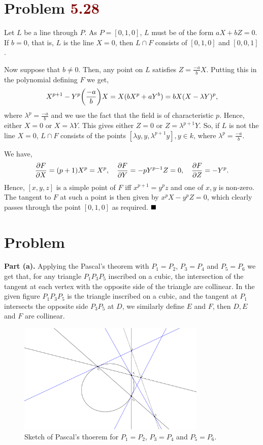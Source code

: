 \documentclass[12pt]{article}
\begin{document}
\section*{Problem \textcolor{maroon}{5.28}}

Let \( L \) be a line through \( P \). As \( P = [0,1,0] \), \( L \) must be of the form \( aX+bZ=0 \). If \( b = 0 \), that is, \( L \) is the line \( X = 0 \), then \( L \cap F \) consists of \( [0,1,0] \) and \( [0,0,1] \).
\smallskip

Now suppose that \( b \neq 0 \). Then, any point on \( L \) satisfies \( Z = \frac{-a}{b}X \). Putting this in the polynomial defining \( F \) we get,
\[
   X^{p+1}-Y^p \qty(\frac{-a}{b}) X = X(bX^p+aY^b) = bX (X-\lambda Y)^p,
\]
where \( \lambda^p = \frac{-a}{b} \) and we use the fact that the field is of characteristic \( p \). Hence, either \( X = 0 \) or \( X = \lambda Y \). This gives either \( Z = 0 \) or \( Z = \lambda^{p+1}Y \). So, if \( L \) is not the line \( X = 0 \), \( L \cap F \) consists of the points \( [\lambda y, y, \lambda^{p+1} y], y \in k \), where \( \lambda^p = \frac{-a}{b} \).
\smallskip

We have,
\[
   \pdv{F}{X} = (p+1)X^p = X^p, \quad \pdv{F}{Y} = -pY^{p-1}Z = 0, \quad \pdv{F}{Z} = -Y^p.
\]
Hence, \( [x,y,z] \) is a simple point of \( F \) iff \( x^{p+1} = y^pz \) and one of \( x,y \) is non-zero. The tangent to \( F \) at such a point is then given by \( x^p X -y^p Z = 0 \), which clearly passes through the point \( [0,1,0] \) as required. \(\hfill \blacksquare\)

\section*{Problem \color{maroon}{5.31}}
\textbf{Part (a).} Applying the Pascal's theorem with $P_1 = P_2$, $P_3 = P_4$ and $P_5 = P_6$ we get that, for any triangle $P_1P_3P_5$ inscribed on a cubic, the intersection of the tangent at each vertex with the opposite side of the triangle are collinear. In the given figure $P_1P_3P_5$ is the triangle inscribed on a cubic, and the tangent at $P_1$ intersects the opposite side $P_3P_5$ at $D$, we similarly define $E$ and $F$, then $D,E$ and $F$ are collinear. 
\begin{figure}[H]
   \centering
   \includegraphics[width=0.8\textwidth]{pascal1.png}
   \caption{Sketch of Pascal's thoerem for $P_1 = P_2$, $P_3 = P_4$ and $P_5 = P_6$.}
\end{figure}
\end{document}
